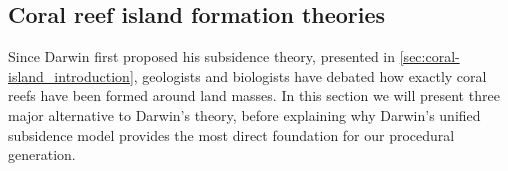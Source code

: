 \subsection{Coral reef island formation theories}
\label{sec:coral-island_sota-coral-theories}
Since Darwin first proposed his subsidence theory, presented in \cref{sec:coral-island_introduction}, geologists and biologists have debated how exactly coral reefs have been formed around land masses. In this section we will present three major alternative to Darwin's theory, before explaining why Darwin's unified subsidence model provides the most direct foundation for our procedural generation.




